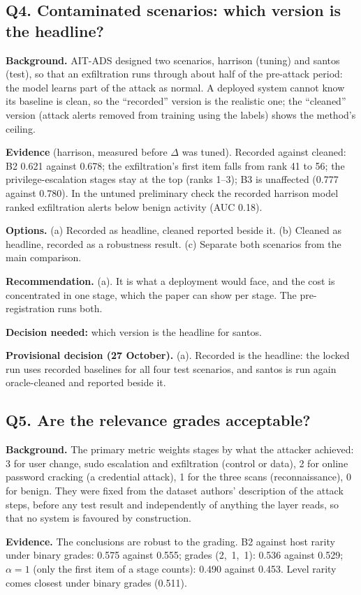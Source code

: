 \documentclass[10.5pt,a4paper]{article}
\newcommand{\rec}[1]{\par\smallskip\noindent\colorbox{gray!12}{\parbox{\dimexpr\linewidth-2\fboxsep}{\textbf{Recommendation.} #1}}\par\smallskip}
\newcommand{\ask}[1]{\par\noindent\textbf{Decision needed:} #1\par\medskip}
\newcommand{\dec}[1]{\par\smallskip\noindent\colorbox{blue!8}{\parbox{\dimexpr\linewidth-2\fboxsep}{\textbf{Provisional decision (27 October).} #1}}\par\medskip}
\newcommand{\sub}[1]{\par\smallskip\noindent\textbf{#1}\quad}
\begin{document}
\subsection*{Q4. Contaminated scenarios: which version is the headline?}

\sub{Background.} AIT-ADS designed two scenarios, harrison (tuning) and santos (test), so that an exfiltration runs through about half of the pre-attack period: the model learns part of the attack as normal. A deployed system cannot know its baseline is clean, so the ``recorded'' version is the realistic one; the ``cleaned'' version (attack alerts removed from training using the labels) shows the method's ceiling.

\sub{Evidence} (harrison, measured before $\Delta$ was tuned). Recorded against cleaned: B2 0.621 against 0.678; the exfiltration's first item falls from rank 41 to 56; the privilege-escalation stages stay at the top (ranks 1--3); B3 is unaffected (0.777 against 0.780). In the untuned preliminary check the recorded harrison model ranked exfiltration alerts below benign activity (AUC 0.18).

\sub{Options.} (a) Recorded as headline, cleaned reported beside it. (b) Cleaned as headline, recorded as a robustness result. (c) Separate both scenarios from the main comparison.

\rec{(a). It is what a deployment would face, and the cost is concentrated in one stage, which the paper can show per stage. The pre-registration runs both.}
\ask{which version is the headline for santos.}
\dec{(a). Recorded is the headline: the locked run uses recorded baselines for all four test scenarios, and santos is run again oracle-cleaned and reported beside it.}

\subsection*{Q5. Are the relevance grades acceptable?}

\sub{Background.} The primary metric weights stages by what the attacker achieved: 3 for user change, sudo escalation and exfiltration (control or data), 2 for online password cracking (a credential attack), 1 for the three scans (reconnaissance), 0 for benign. They were fixed from the dataset authors' description of the attack steps, before any test result and independently of anything the layer reads, so that no system is favoured by construction.

\sub{Evidence.} The conclusions are robust to the grading. B2 against host rarity under binary grades: 0.575 against 0.555; grades (2,~1,~1): 0.536 against 0.529; $\alpha = 1$ (only the first item of a stage counts): 0.490 against 0.453. Level rarity comes closest under binary grades (0.511).
\end{document}
